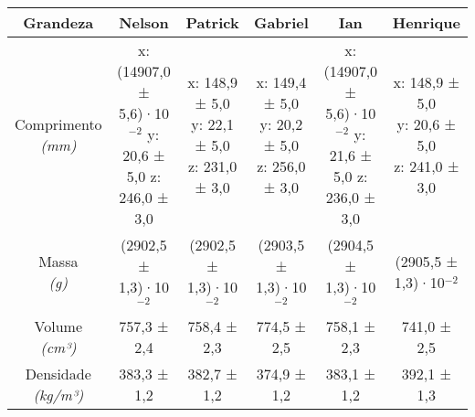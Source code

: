 \documentclass{article}
\begin{document}
\begin{table}[h!]
\centering
\begin{tabular}{c c c c c c }
\toprule
Grandeza & Nelson & Patrick & Gabriel & Ian & Henrique\\
\midrule
\shortstack{Comprimento\\\textit{(mm)}} & \shortstack{x: (14907,0 ± 5,6)·10$^{-2}$\\y: 20,6 ± 5,0\\z: 246,0 ± 3,0} & \shortstack{x: 148,9 ± 5,0\\y: 22,1 ± 5,0\\z: 231,0 ± 3,0} & \shortstack{x: 149,4 ± 5,0\\y: 20,2 ± 5,0\\z: 256,0 ± 3,0} & \shortstack{x: (14907,0 ± 5,6)·10$^{-2}$\\y: 21,6 ± 5,0\\z: 236,0 ± 3,0} & \shortstack{x: 148,9 ± 5,0\\y: 20,6 ± 5,0\\z: 241,0 ± 3,0}\\[4pt]
\shortstack{Massa\\\textit{(g)}} & (2902,5 ± 1,3)·10$^{-2}$ & (2902,5 ± 1,3)·10$^{-2}$ & (2903,5 ± 1,3)·10$^{-2}$ & (2904,5 ± 1,3)·10$^{-2}$ & (2905,5 ± 1,3)·10$^{-2}$\\[4pt]
\shortstack{Volume\\\textit{(cm³)}} & 757,3 ± 2,4 & 758,4 ± 2,3 & 774,5 ± 2,5 & 758,1 ± 2,3 & 741,0 ± 2,5\\[4pt]
\shortstack{Densidade\\\textit{(kg/m³)}} & 383,3 ± 1,2 & 382,7 ± 1,2 & 374,9 ± 1,2 & 383,1 ± 1,2 & 392,1 ± 1,3\\[4pt]
\bottomrule
\end{tabular}
\end{table}
\end{document}
